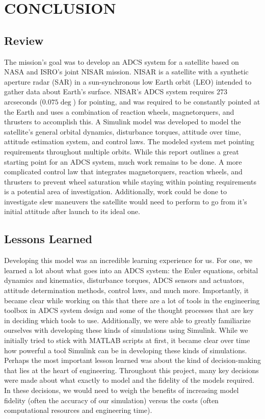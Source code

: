 \section{\Large CONCLUSION}

\subsection{Review}
The mission's goal was to develop an ADCS system for a satellite based on NASA and ISRO's joint NISAR mission. NISAR is a satellite with a synthetic aperture radar (SAR) in a sun-synchronous low Earth orbit (LEO) intended to gather data about Earth's surface. NISAR's ADCS system requires $273$ arcseconds ($0.075 \deg$) for pointing, and was required to be constantly pointed at the Earth and uses a combination of reaction wheels, magnetorquers, and thrusters to accomplish this. A Simulink model was developed to model the satellite's general orbital dynamics, disturbance torques, attitude over time, attitude estimation system, and control laws. The modeled system met pointing requirements throughout multiple orbits. While this report outlines a great starting point for an ADCS system, much work remains to be done. A more complicated control law that integrates magnetorquers, reaction wheels, and thrusters to prevent wheel saturation while staying within pointing requirements is a potential area of investigation. Additionally, work could be done to investigate slew maneuvers the satellite would need to perform to go from it's initial attitude after launch to its ideal one.

\subsection{Lessons Learned}
Developing this model was an incredible learning experience for us. For one, we learned a lot about what goes into an ADCS system: the Euler equations, orbital dynamics and kinematics, disturbance torques, ADCS sensors and actuators, attitude determination methods, control laws, and much more. Importantly, it became clear while working on this that there are a lot of tools in the engineering toolbox in ADCS system design and some of the thought processes that are key in deciding which tools to use. Additionally, we were able to greatly familiarize ourselves with developing these kinds of simulations using Simulink. While we initially tried to stick with MATLAB scripts at first, it became clear over time how powerful a tool Simulink can be in developing these kinds of simulations. Perhaps the most important lesson learned was about the kind of decision-making that lies at the heart of engineering. Throughout this project, many key decisions were made about what exactly to model and the fidelity of the models required. In these decisions, we would need to weigh the benefits of increasing model fidelity (often the accuracy of our simulation) versus the costs (often computational resources and engineering time).